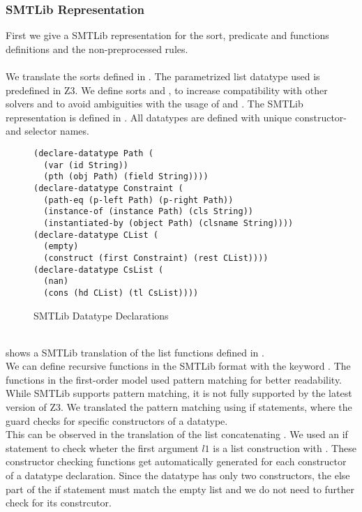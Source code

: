 \subsubsection{SMTLib Representation}
First we give a SMTLib representation for
the sort, predicate and functions definitions
and the non-preprocessed rules.\\
\\
We translate the sorts defined in .
The parametrized list datatype used is predefined in Z3.
We define sorts  and ,
to increase compatibility with other solvers
and to avoid ambiguities with the usage of \Constrs and \Constrss.
The SMTLib representation is defined in .
All datatypes are defined with unique constructor- and selector names.
%
\begin{figure}[h]
\begin{lstlisting}[language=smtlib]
(declare-datatype Path (
  (var (id String))
  (pth (obj Path) (field String))))
(declare-datatype Constraint (
  (path-eq (p-left Path) (p-right Path))
  (instance-of (instance Path) (cls String))
  (instantiated-by (object Path) (clsname String))))
(declare-datatype CList (
  (empty)
  (construct (first Constraint) (rest CList))))
(declare-datatype CsList (
  (nan)
  (cons (hd CList) (tl CsList))))
\end{lstlisting}
\caption{SMTLib Datatype Declarations}
\label{fig:smtlib-sorts}
\end{figure}\\
%
 shows a SMTLib translation
of the list functions defined in .\\
We can define recursive functions in the SMTLib format
with the keyword .
The functions in the first-order model used pattern matching
for better readability. While SMTLib supports pattern matching,
it is not fully supported by the latest version of Z3.
We translated the pattern matching using if statements,
where the guard checks for specific constructors of a datatype.\\
This can be observed in the translation of the list concatenating .
We used an if statement to check wheter the first argument $l1$
is a list construction with .
These constructor checking functions get automatically
generated for each constructor of a datatype declaration.
Since the  datatype has only two constructors,
the else part of the if statement must match the empty list
and we do not need to further check for its constrcutor.

